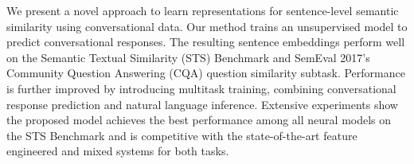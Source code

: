 We present a novel approach to learn representations for sentence-level semantic similarity using conversational data. Our method trains an unsupervised model to predict conversational responses. The resulting sentence embeddings perform well on the Semantic Textual Similarity (STS) Benchmark and SemEval 2017's Community Question Answering (CQA) question similarity subtask. Performance is further improved by introducing multitask training, combining conversational response prediction and natural language inference. Extensive experiments show the proposed model achieves the best performance among all neural models on the STS Benchmark and is competitive with the state-of-the-art feature engineered and mixed systems for both tasks.
